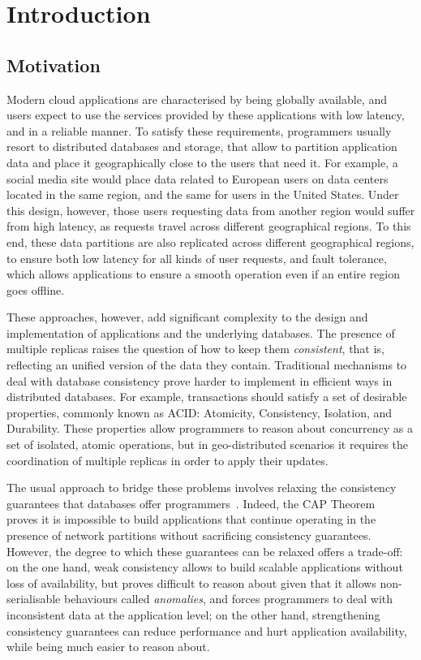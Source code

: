 \cleardoublepage
\chapter{Introduction}
\label{chapter:introduction}

\section{Motivation}

Modern cloud applications are characterised by being globally available, and users expect to use the services provided by these applications with low latency, and in a reliable manner. To satisfy these requirements, programmers usually resort to distributed databases and storage, that allow to partition application data and place it geographically close to the users that need it. For example, a social media site would place data related to European users on data centers located in the same region, and the same for users in the United States. Under this design, however, those users requesting data from another region would suffer from high latency, as requests travel across different geographical regions. To this end, these data partitions are also replicated across different geographical regions, to ensure both low latency for all kinds of user requests, and fault tolerance, which allows applications to ensure a smooth operation even if an entire region goes offline.

These approaches, however, add significant complexity to the design and implementation of applications and the underlying databases. The presence of multiple replicas raises the question of how to keep them \emph{consistent}, that is, reflecting an unified version of the data they contain. Traditional mechanisms to deal with database consistency prove harder to implement in efficient ways in distributed databases. For example, transactions should satisfy a set of desirable properties, commonly known as ACID: Atomicity, Consistency, Isolation, and Durability. These properties allow programmers to reason about concurrency as a set of isolated, atomic operations, but in geo-distributed scenarios it requires the coordination of multiple replicas in order to apply their updates.

The usual approach to bridge these problems involves relaxing the consistency guarantees that databases offer programmers~\citep{vogels-eventual}. Indeed, the CAP Theorem~\citep{cap-brewer, cap-theorem} proves it is impossible to build applications that continue operating in the presence of network partitions without sacrificing consistency guarantees. However, the degree to which these guarantees can be relaxed offers a trade-off: on the one hand, weak consistency allows to build scalable applications without loss of availability, but proves difficult to reason about given that it allows non-serialisable behaviours called \emph{anomalies}, and forces programmers to deal with inconsistent data at the application level; on the other hand, strengthening consistency guarantees can reduce performance and hurt application availability, while being much easier to reason about.

